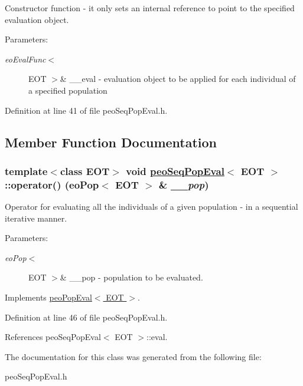 Constructor function - it only sets an internal reference to point to the specified evaluation object. 

\begin{Desc}
\item[Parameters:]
\begin{description}
\item[{\em eo\-Eval\-Func$<$}]EOT $>$\& \_\-\_\-eval - evaluation object to be applied for each individual of a specified population \end{description}
\end{Desc}


Definition at line 41 of file peo\-Seq\-Pop\-Eval.h.

\subsection{Member Function Documentation}
\hypertarget{classpeoSeqPopEval_b2c88b9a3ad9091949acf741844eb02f}{
\subsubsection[operator()]{\setlength{\rightskip}{0pt plus 5cm}template$<$class EOT$>$ void \hyperlink{classpeoSeqPopEval}{peo\-Seq\-Pop\-Eval}$<$ EOT $>$::operator() (eo\-Pop$<$ EOT $>$ \& {\em \_\-\_\-pop})}}
\label{classpeoSeqPopEval_b2c88b9a3ad9091949acf741844eb02f}


Operator for evaluating all the individuals of a given population - in a sequential iterative manner. 

\begin{Desc}
\item[Parameters:]
\begin{description}
\item[{\em eo\-Pop$<$}]EOT $>$\& \_\-\_\-pop - population to be evaluated. \end{description}
\end{Desc}


Implements \hyperlink{classpeoPopEval_2f208067a5e39c3b26c1234050a41e8f}{peo\-Pop\-Eval$<$ EOT $>$}.

Definition at line 46 of file peo\-Seq\-Pop\-Eval.h.

References peo\-Seq\-Pop\-Eval$<$ EOT $>$::eval.

The documentation for this class was generated from the following file:\begin{CompactItemize}
\item 
peo\-Seq\-Pop\-Eval.h\end{CompactItemize}
